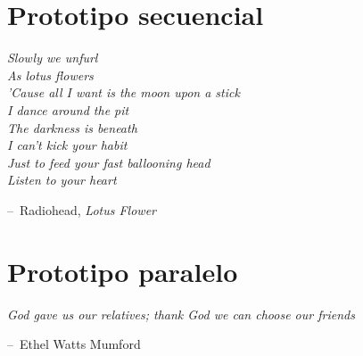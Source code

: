 \documentclass[12pt,letterpaper,titlepage,oneside,openright]{book}
\makeatletter
\newenvironment{chapquote}[2][2em]
  {\setlength{\@tempdima}{#1}%
   \def\chapquote@author{#2}%
   \parshape 1 \@tempdima \dimexpr\textwidth-2\@tempdima\relax%
   \itshape}
  {\par\vspace{.5em}\normalfont\hfill--\ \chapquote@author\hspace*{\@tempdima}\par\bigskip}
\makeatother
\begin{document}
\lipsum[1-2]

\chapter{Prototipo secuencial}

\begin{chapquote}{Radiohead, \textit{Lotus Flower}}
\noindent Slowly we unfurl\\
As lotus flowers\\
'Cause all I want is the moon upon a stick\\
I dance around the pit\\
The darkness is beneath\\
I can't kick your habit\\
Just to feed your fast ballooning head\\
Listen to your heart
\end{chapquote}

\lipsum[1-2]

\chapter{Prototipo paralelo}

\begin{chapquote}{Ethel Watts Mumford}
\noindent God gave us our relatives; thank God we can choose our friends
\end{chapquote}

\lipsum[1-2]
\end{document}
